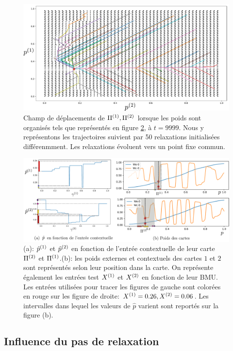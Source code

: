 \documentclass[../main]{subfiles}
\begin{document}
\begin{figure}
\centering
\includegraphics[width=\textwidth]{champ_006.pdf}
\caption{Champ de déplacements de $\Pi^{({1})},\Pi^{({2})}$ lorsque les poids sont organisés tels que représentés en figure \ref{fig:w006}, à $t=9999$. Nous y représentons les trajectoires suivient par 50 relaxations initialisées différenmment. Les relaxations évoluent vers un point fixe commun. }
\label{fig:champ_9999}
\end{figure}

\begin{figure}
	\includegraphics[width=\textwidth]{am_w_006_noinp}
	\caption{(a): $\hat{p}^{({1})}$ et $\hat{p}^{({2})}$ en fonction de l'entrée contextuelle de leur carte $\Pi^{({2})}$ et $\Pi^{({1})}$.(b): les poids externes et contextuels des cartes $1$ et $2$ sont représentés selon leur position dans la carte. On représente également les entrées test $X^{({1})}$ et $X^{({2})}$ en fonction de leur BMU. Les entrées utilisées pour tracer les figures de gauche sont colorées en rouge sur les figure de droite: $X^{({1})}=0.26,X^{({2})}=0.06$. Les intervalles dans lequel les valeurs de $\hat{p}$ varient sont reportés sur la figure (b).}
	\label{fig:w006}
	\end{figure}

\subsection{Influence du pas de relaxation}
\end{document}
